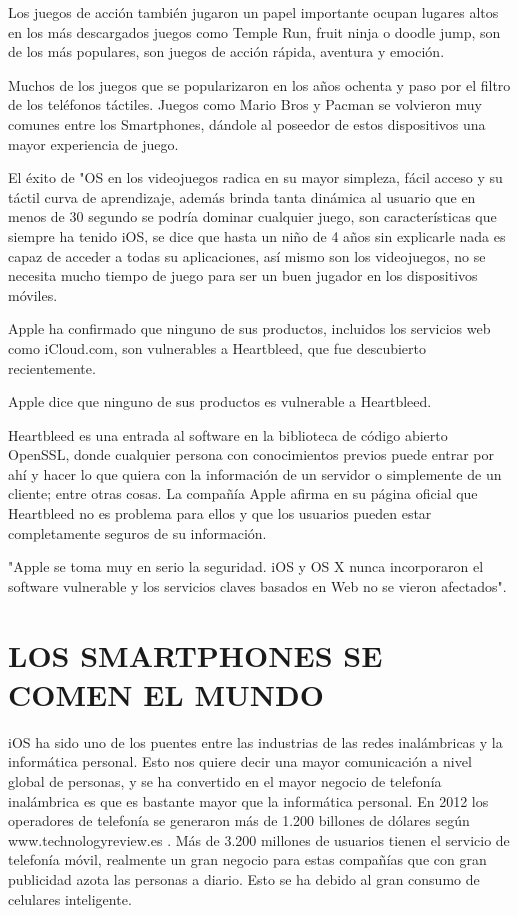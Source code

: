 Los juegos de acción también jugaron un papel importante
ocupan lugares altos en los más descargados juegos como
Temple Run, fruit ninja o doodle jump, son de los más
populares, son juegos de acción rápida, aventura y emoción.

Muchos de los juegos que se popularizaron en los años ochenta
y paso por el filtro de los teléfonos táctiles. Juegos como Mario
Bros y Pacman se volvieron muy comunes entre los
Smartphones, dándole al poseedor de estos dispositivos una
mayor experiencia de juego.

El éxito de "OS en los videojuegos radica en su mayor simpleza,
fácil acceso y su táctil curva de aprendizaje, además brinda
tanta dinámica al usuario que en menos de 30 segundo se podría
dominar cualquier juego, son características que siempre ha
tenido iOS, se dice que hasta un niño de 4 años sin explicarle
nada es capaz de acceder a todas su aplicaciones, así mismo son
los videojuegos, no se necesita mucho tiempo de juego para ser
un buen jugador en los dispositivos móviles.

Apple ha confirmado que ninguno de sus productos, incluidos los
servicios web como iCloud.com, son vulnerables a Heartbleed, que
fue descubierto recientemente.

Apple dice que ninguno de sus
productos es vulnerable a
Heartbleed.

Heartbleed es una entrada al software en la biblioteca de código
abierto OpenSSL, donde cualquier persona con conocimientos
previos puede entrar por ahí y hacer lo que quiera con la
información de un servidor o simplemente de un cliente; entre
otras cosas. La compañía Apple afirma en su página oficial que
Heartbleed no es problema para ellos y que los usuarios pueden estar
completamente seguros de su información.

"Apple se toma muy en serio la seguridad. iOS y OS X
nunca incorporaron el software vulnerable y los servicios
claves basados en Web no se vieron afectados".


\section*{LOS SMARTPHONES SE COMEN EL MUNDO}

iOS ha sido uno de los puentes entre las industrias de las redes
inalámbricas y la informática personal. Esto nos quiere decir
una mayor comunicación a nivel global de personas, y se ha
convertido en el mayor negocio de telefonía inalámbrica es que
es bastante mayor que la informática personal. En 2012 los
operadores de telefonía se generaron más de 1.200 billones de
dólares según www.technologyreview.es . Más de 3.200 millones
de usuarios tienen el servicio de telefonía móvil, realmente un
gran negocio para estas compañías que con gran publicidad
azota las personas a diario. Esto se ha debido al gran consumo
de celulares inteligente.


